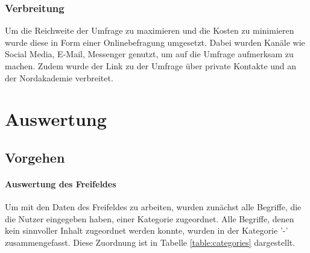 \documentclass[a4paper]{article}
\begin{document}
            \subsubsection{Verbreitung}
                Um die Reichweite der Umfrage zu maximieren und die Kosten zu minimieren wurde diese in Form einer Onlinebefragung umgesetzt. Dabei wurden Kanäle wie Social Media, E-Mail, Messenger genutzt, um auf die Umfrage aufmerksam zu machen. Zudem wurde der Link zu der Umfrage über private Kontakte und an der Nordakademie verbreitet.
                
    \section{Auswertung}
        \subsection{Vorgehen}
            \paragraph{Auswertung des Freifeldes}
                Um mit den Daten des Freifeldes zu arbeiten, wurden zunächst alle Begriffe, die die Nutzer eingegeben haben, einer Kategorie zugeordnet. Alle Begriffe, denen kein sinnvoller Inhalt zugeordnet werden konnte, wurden in der Kategorie '-' zusammengefasst. Diese Zuordnung ist in Tabelle \ref{table:categories} dargestellt.\\
            
\end{document}
